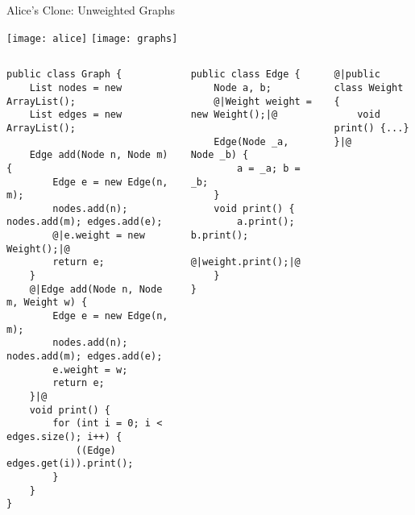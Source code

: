 \begin{frame}[fragile]{Alice's Clone: Unweighted Graphs}
	\vspace{-1.2cm}
	\begin{flushright}
		\texttt{[image: alice]}
		\texttt{[image: graphs]}
	\end{flushright}
	\begin{tiny}
		\begin{columns}
				\vspace{-15mm}				
\vspace{3mm}
\begin{lstlisting}
public class Graph {
	List nodes = new ArrayList();
	List edges = new ArrayList();

	Edge add(Node n, Node m) {
		Edge e = new Edge(n, m);
		nodes.add(n); nodes.add(m); edges.add(e);
		@|e.weight = new Weight();|@
		return e;
	}
	@|Edge add(Node n, Node m, Weight w) {
		Edge e = new Edge(n, m);
		nodes.add(n); nodes.add(m); edges.add(e);
		e.weight = w;
		return e;
	}|@
	void print() {
		for (int i = 0; i < edges.size(); i++) {
			((Edge) edges.get(i)).print();
		}
	}
}
\end{lstlisting}
\begin{lstlisting}
public class Edge {
	Node a, b;
	@|Weight weight = new Weight();|@

	Edge(Node _a, Node _b) {
		a = _a; b = _b;
	}
	void print() {
		a.print(); b.print();
		@|weight.print();|@
	}
}
\end{lstlisting}
\begin{lstlisting}
@|public class Weight {
	void print() {...}
}|@
\end{lstlisting}
		\end{columns}
	\end{tiny}
\end{frame}

